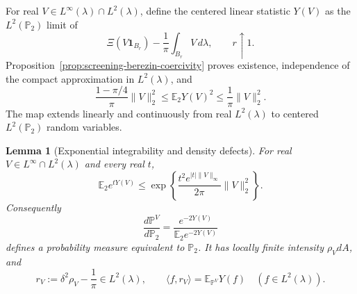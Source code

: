 \documentclass[11pt,a4paper]{article}
\numberwithin{equation}{section}
\newtheorem{lemma}[theorem]{Lemma}
\theoremstyle{definition}
\theoremstyle{remark}
\begin{document}
For real $V\in L^\infty(\lambda)\cap L^2(\lambda)$, define the centered
linear statistic $Y(V)$ as the $L^2(\mathbb P_2)$ limit of
\[
 \Xi(V\mathbf1_{B_r})-\frac1\pi
          \int_{B_r}V\,d\lambda,\qquad r\uparrow1.
\]
Proposition~\ref{prop:screening-berezin-coercivity} proves existence,
independence of the compact approximation in $L^2(\lambda)$, and
\begin{equation}
 \frac{1-\pi/4}{\pi}\|V\|_2^2
 \le\mathbb E_2Y(V)^2\le\frac1\pi\|V\|_2^2.
 \label{eq:screening-centered-variance}
\end{equation}
The map extends linearly and continuously from real $L^2(\lambda)$
to centered $L^2(\mathbb P_2)$ random variables.

\begin{lemma}[Exponential integrability and density defects]
\label{lem:screening-tilt-integrability}
For real $V\in L^\infty\cap L^2(\lambda)$ and every real $t$,
\begin{equation}
 \mathbb E_2e^{tY(V)}
 \le \exp\left\{\frac{t^2e^{|t|\|V\|_\infty}}{2\pi}
                          \|V\|_2^2\right\}.
 \label{eq:screening-centered-exponential}
\end{equation}
Consequently
\[
 \frac{d\mathbb P^V}{d\mathbb P_2}
   =\frac{e^{-2Y(V)}}{\mathbb E_2 e^{-2Y(V)}}
\]
defines a probability measure equivalent to $\mathbb P_2$.  It has
locally finite intensity $\rho_VdA$, and
\[
 r_V:=\delta^2\rho_V-\frac1\pi\in L^2(\lambda),\qquad
 \langle f,r_V\rangle=\mathbb E_{\mathbb P^V}Y(f)
 \quad(f\in L^2(\lambda)).
\]
\end{lemma}
\end{document}

